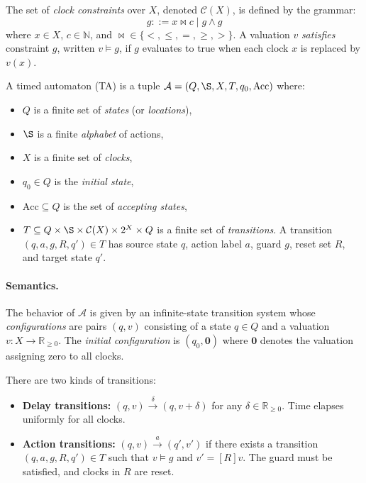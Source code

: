 The set of \emph{clock constraints} over $X$, denoted $\mathcal{C}(X)$, is defined by the grammar:
\[
g ::= x \bowtie c \mid g \wedge g
\]
where $x \in X$, $c \in \mathbb{N}$, and $\bowtie \in \{<, \leq, =, \geq, >\}$. A valuation $v$ \emph{satisfies} constraint $g$, written $v \models g$, if $g$ evaluates to true when each clock $x$ is replaced by $v(x)$.

\begin{definition}
\label{def:timed-automaton}
A \textsf{timed automaton} (TA) is a tuple $\mathcal{A} = (Q, \S, X, T, q_0, \text{Acc})$ where:
\begin{itemize}
\item $Q$ is a finite set of \emph{states} (or \emph{locations}),
\item $\S$ is a finite \emph{alphabet} of actions,
\item $X$ is a finite set of \emph{clocks},
\item $q_0 \in Q$ is the \emph{initial state},
\item $\text{Acc} \subseteq Q$ is the set of \emph{accepting states},
\item $T \subseteq Q \times \S \times \mathcal{C}(X) \times 2^X \times Q$ is a finite set of \emph{transitions}. A transition $(q, a, g, R, q') \in T$ has source state $q$, action label $a$, guard $g$, reset set $R$, and target state $q'$.
\end{itemize}
\end{definition}

\paragraph{Semantics.} The behavior of $\mathcal{A}$ is given by an infinite-state transition system whose \emph{configurations} are pairs $(q, v)$ consisting of a state $q \in Q$ and a valuation $v : X \to \mathbb{R}_{\geq 0}$. The \emph{initial configuration} is $(q_0, \mathbf{0})$ where $\mathbf{0}$ denotes the valuation assigning zero to all clocks.

There are two kinds of transitions:
\begin{itemize}
\item \textbf{Delay transitions:} $(q, v) \xrightarrow{\delta} (q, v + \delta)$ for any $\delta \in \mathbb{R}_{\geq 0}$. Time elapses uniformly for all clocks.
\item \textbf{Action transitions:} $(q, v) \xrightarrow{a} (q', v')$ if there exists a transition $(q, a, g, R, q') \in T$ such that $v \models g$ and $v' = [R]v$. The guard must be satisfied, and clocks in $R$ are reset.
\end{itemize}

